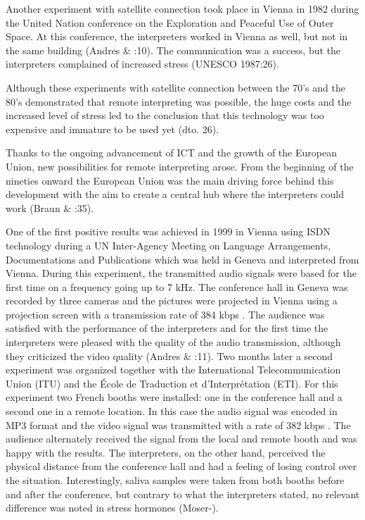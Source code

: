 \documentclass[output=paper]{langsci/langscibook}
\begin{document}
Another experiment with satellite connection took place in Vienna in 1982 during the United Nation conference on the Exploration and Peaceful Use of Outer Space. At this conference, the interpreters worked in Vienna as well, but not in the same building (Andres \& \citealt{Falk2009}:10). The communication was a success, but the interpreters complained of increased stress (UNESCO 1987:26).

Although these experiments with satellite connection between the 70’s and the 80’s demonstrated that remote interpreting was possible, the huge costs and the increased level of stress led to the conclusion that this technology was too expensive and immature to be used yet (dto. 26).

Thanks to the ongoing advancement of ICT and the growth of the European Union, new possibilities for remote interpreting arose. From the beginning of the nineties onward the European Union was the main driving force behind this development with the aim to create a central hub where the interpreters could work (Braun \& \citealt{Taylor2011}:35).

One of the first positive results was achieved in 1999 in Vienna using ISDN technology during a UN Inter-Agency Meeting on Language Arrangements, Documentations and Publications which was held in Geneva and interpreted from Vienna. During this experiment, the transmitted audio signals were based for the first time on a frequency going up to 7 kHz. The conference hall in Geneva was recorded by three cameras and the pictures were projected in Vienna using a projection screen with a transmission rate of 384 kbps \citep[63]{Mouzourakis2006}. The audience was satisfied with the performance of the interpreters and for the first time the interpreters were pleased with the quality of the audio transmission, although they criticized the video quality (Andres \& \citealt{Falk2009}:11). Two months later a second experiment was organized together with the International Telecommunication Union (ITU) and the École de Traduction et d’Interprétation (ETI). For this experiment two French booths were installed: one in the conference hall and a second one in a remote location. In this case the audio signal was encoded in MP3 format and the video signal was transmitted with a rate of 382 kbps \citep[63]{Mouzourakis2006}. The audience alternately received the signal from the local and remote booth and was happy with the results. The interpreters, on the other hand, perceived the physical distance from the conference hall and had a feeling of losing control over the situation. Interestingly, saliva samples were taken from both booths before and after the conference, but contrary to what the interpreters stated, no relevant difference was noted in stress hormones (Moser-\citealt{Mercer2003}).
\end{document}
